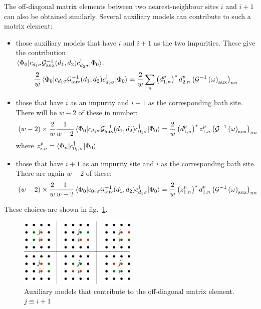 \documentclass{report}
\numberwithin{equation}{section}
\begin{document}
The off-diagonal matrix elements between two nearest-neighbour sites \(i\) and \(i+1\) can also be obtained similarly. Several  auxiliary models can contribute to such a matrix element:
\begin{itemize}
	\item those auxiliary models that have \(i\) and \(i+1\) as the two impurities. These give the contribution \\
		\(\braket{\Phi_0 | c_{d_1\sigma} \mathcal{G}^{-1}_\text{aux}(d_1,d_2) c^\dagger_{d_2\sigma} | \Phi_0}\). 
	\begin{equation}\begin{aligned}
		\frac{2}{w}\braket{\Phi_0 | c_{d_1\sigma} \mathcal{G}^{-1}_\text{aux}(d_1,d_2) c^\dagger_{d_2\sigma} | \Phi_0} = \frac{2}{w}\sum_{n} \left(d^p_{1,n}\right)^*d^p_{2,n} \left(\mathcal{G}^{-1}\left(\omega\right) _\text{aux}\right)_{nn}
	\end{aligned}\end{equation}
	\item those that have \(i\) as an impurity and \(i+1\) as the corresponding bath site. There will be \(w-2\) of these in number:
	\begin{equation}
		(w-2) \times \frac{2}{w}\frac{1}{w-2}\braket{\Phi_0 | c_{d_1\sigma} \mathcal{G}^{-1}_\text{aux}(d_1,d_2) c^\dagger_{0_1\sigma} | \Phi_0} = \frac{2}{w}\left(d^p_{1,n}\right)^* z^p_{1,n} \left(\mathcal{G}^{-1}\left(\omega\right) _\text{aux}\right)_{nn}
	\end{equation}
		where \(z^p_{i,n} = \braket{\Phi_n | c^\dagger_{0_i,\sigma} | \Phi_0}\).
	\item those that have \(i+1\) as an impurity site and \(i\) as the corresponding bath site. There are again \(w-2\) of these:
	\begin{equation}
		(w-2) \times \frac{2}{w}\frac{1}{w-2}\braket{\Phi_0 | c_{0_1\sigma} \mathcal{G}^{-1}_\text{aux}(d_1,d_2) c^\dagger_{d_1\sigma} | \Phi_0} = \frac{2}{w}\left(z^p_{1,n}\right)^* d^p_{1,n} \left(\mathcal{G}^{-1}\left(\omega\right) _\text{aux}\right)_{nn}
	\end{equation}
\end{itemize}
These choices are shown in fig.~\ref{off-diag-contrib}.
\begin{figure}[!htb]
	\centering
	\includegraphics[width=0.5\textwidth]{../figures/offdiagonal_contributors.pdf}
	\caption{Auxiliary models that contribute to the off-diagonal matrix element. \(j \equiv i+1\)}
	\label{off-diag-contrib}
\end{figure}
\end{document}
